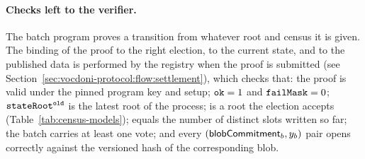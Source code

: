 \paragraph{Checks left to the verifier.} The batch program proves a transition from whatever root and census it is given. The binding of the proof to the right election, to the current state, and to the published data is performed by the registry when the proof is submitted (see Section~\ref{sec:vocdoni-protocol:flow:settlement}), which checks that: the proof is valid under the pinned program key and setup; $\texttt{ok} = 1$ and $\texttt{failMask} = 0$; $\texttt{stateRoot}^\texttt{old}$ is the latest root of the process; \censusroot is a root the election accepts (Table~\ref{tab:census-models}); \occupiedbefore equals the number of distinct slots written so far; the batch carries at least one vote; and every $({\sf{blobCommitment}}_b, y_b)$ pair opens correctly against the versioned hash of the corresponding blob.

